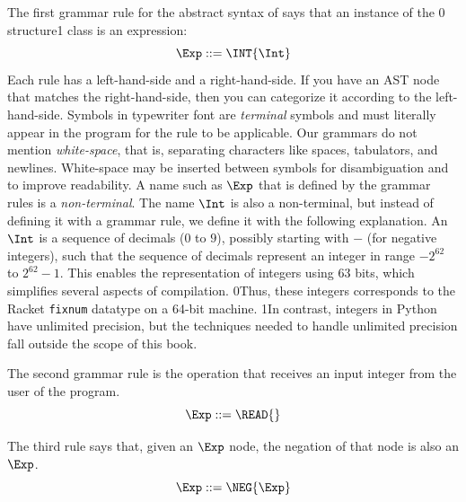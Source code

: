 \documentclass[7x10,nocrop]{TimesAPriori_MIT}%
\def\racketEd{0}
\def\pythonEd{1}
\def\edition{1}
\newcommand{\racket}[1]{{\if\edition\racketEd{#1}\fi}}
\newcommand{\python}[1]{{\if\edition\pythonEd #1\fi}}
\begin{document}
The first grammar rule for the abstract syntax of \LangInt{} says that an
instance of the \racket{ structure}\python{ class} is an expression:
\begin{equation}
\Exp ::= \INT{\Int}  \label{eq:arith-int}
\end{equation}
%
Each rule has a left-hand-side and a right-hand-side.
If you have an AST node that matches the
right-hand-side, then you can categorize it according to the
left-hand-side.
%
Symbols in typewriter font are \emph{terminal} symbols and must
literally appear in the program for the rule to be applicable.
%
Our grammars do not mention \emph{white-space}, that is, separating characters
like spaces, tabulators, and newlines. White-space may be inserted
between symbols for disambiguation and to improve readability.
%
A name such as $\Exp$ that is defined by the grammar rules is a
\emph{non-terminal}.  
%
The name $\Int$ is also a non-terminal, but instead of defining it
with a grammar rule, we define it with the following explanation.  An
$\Int$ is a sequence of decimals ($0$ to $9$), possibly starting with
$-$ (for negative integers), such that the sequence of decimals
represent an integer in range $-2^{62}$ to $2^{62}-1$.  This enables
the representation of integers using 63 bits, which simplifies several
aspects of compilation. \racket{Thus, these integers corresponds to
  the Racket \texttt{fixnum} datatype on a 64-bit machine.}
\python{In contrast, integers in Python have unlimited precision, but
  the techniques needed to handle unlimited precision fall outside the
  scope of this book.}

The second grammar rule is the \READOP{} operation that receives an
input integer from the user of the program.
\begin{equation}
  \Exp ::= \READ{} \label{eq:arith-read}
\end{equation}

The third rule says that, given an $\Exp$ node, the negation of that
node is also an $\Exp$.
\begin{equation}
  \Exp ::= \NEG{\Exp}  \label{eq:arith-neg}
\end{equation}
\end{document}
